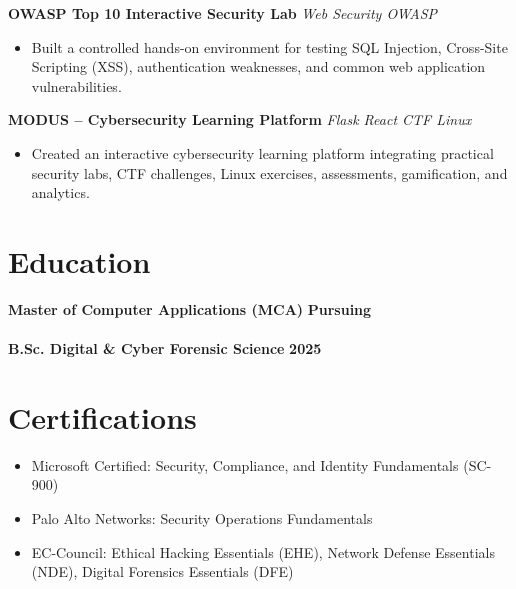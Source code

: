 \documentclass[10pt,a4paper]{article}
\newcommand{\resumeitem}[1]{\item #1}
\begin{document}
\vspace{2pt}
\noindent\textbf{OWASP Top 10 Interactive Security Lab} \hfill {\fontsize{8.5}{10}\selectfont\textit{Web Security \textbar{} OWASP}}\\
\begin{itemize}
\resumeitem{Built a controlled hands-on environment for testing SQL Injection, Cross-Site Scripting (XSS), authentication weaknesses, and common web application vulnerabilities.}
\end{itemize}

\vspace{2pt}
\noindent\textbf{MODUS -- Cybersecurity Learning Platform} \hfill {\fontsize{8.5}{10}\selectfont\textit{Flask \textbar{} React \textbar{} CTF \textbar{} Linux}}\\
\begin{itemize}
\resumeitem{Created an interactive cybersecurity learning platform integrating practical security labs, CTF challenges, Linux exercises, assessments, gamification, and analytics.}
\end{itemize}

\section{Education}

\noindent\textbf{Master of Computer Applications (MCA)} \hfill \textbf{Pursuing}\\
\\[2pt]

\noindent\textbf{B.Sc. Digital \& Cyber Forensic Science} \hfill \textbf{2025}\\

\section{Certifications}
\begin{itemize}
\resumeitem{Microsoft Certified: Security, Compliance, and Identity Fundamentals (SC-900)}
\resumeitem{Palo Alto Networks: Security Operations Fundamentals}
\resumeitem{EC-Council: Ethical Hacking Essentials (EHE), Network Defense Essentials (NDE), Digital Forensics Essentials (DFE)}
\end{itemize}
\end{document}
